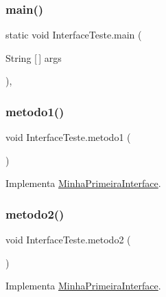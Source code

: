 \subsubsection{\texorpdfstring{main()}{main()}}
{\footnotesize\ttfamily static void Interface\+Teste.\+main (\begin{DoxyParamCaption}\item[{String \mbox{[}$\,$\mbox{]}}]{args }\end{DoxyParamCaption})\hspace{0.3cm}{\ttfamily [inline]}, {\ttfamily [static]}}

\hypertarget{class_interface_teste_a6b6f074e45a07ce51474f4e8cbcb4787}{}\label{class_interface_teste_a6b6f074e45a07ce51474f4e8cbcb4787} 
\subsubsection{\texorpdfstring{metodo1()}{metodo1()}}
{\footnotesize\ttfamily void Interface\+Teste.\+metodo1 (\begin{DoxyParamCaption}{ }\end{DoxyParamCaption})\hspace{0.3cm}{\ttfamily [inline]}}



Implementa \hyperlink{interface_minha_primeira_interface_a7790ccc288e3d320de41ec6c179aeed9}{Minha\+Primeira\+Interface}.

\hypertarget{class_interface_teste_a3dd6ee8d550dacfab9ca0895ddf61468}{}\label{class_interface_teste_a3dd6ee8d550dacfab9ca0895ddf61468} 
\subsubsection{\texorpdfstring{metodo2()}{metodo2()}}
{\footnotesize\ttfamily void Interface\+Teste.\+metodo2 (\begin{DoxyParamCaption}{ }\end{DoxyParamCaption})\hspace{0.3cm}{\ttfamily [inline]}}



Implementa \hyperlink{interface_minha_primeira_interface_ad8461cbd12b06d9b8991e5c0558dbabb}{Minha\+Primeira\+Interface}.

\hypertarget{class_interface_teste_a792ff1fc8b64a4ea9c4971e61281142d}{}\label{class_interface_teste_a792ff1fc8b64a4ea9c4971e61281142d} 
